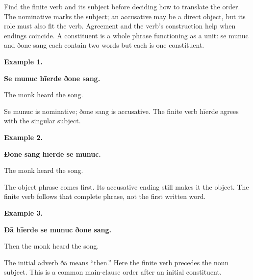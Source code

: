 Find the finite verb and its subject before deciding how to translate the order. The nominative marks the subject; an accusative may be a direct object, but its role must also fit the verb. Agreement and the verb’s construction help when endings coincide. A constituent is a whole phrase functioning as a unit: se munuc and ðone sang each contain two words but each is one constituent.

\textbf{Example 1.}

\textbf{Se munuc hīerde ðone sang.}

The monk heard the song.

Se munuc is nominative; ðone sang is accusative. The finite verb hīerde agrees with the singular subject.

\textbf{Example 2.}

\textbf{Ðone sang hīerde se munuc.}

The monk heard the song.

The object phrase comes first. Its accusative ending still makes it the object. The finite verb follows that complete phrase, not the first written word.

\textbf{Example 3.}

\textbf{Ðā hīerde se munuc ðone sang.}

Then the monk heard the song.

The initial adverb ðā means “then.” Here the finite verb precedes the noun subject. This is a common main-clause order after an initial constituent.

